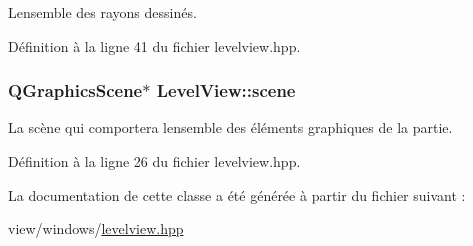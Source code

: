 L\textquotesingle{}ensemble des rayons dessinés. 



Définition à la ligne 41 du fichier levelview.\+hpp.

\hypertarget{classLevelView_a81030b9faa8743a629553447bfb982ea}{}
\subsubsection[{scene}]{\setlength{\rightskip}{0pt plus 5cm}Q\+Graphics\+Scene$\ast$ Level\+View\+::scene\hspace{0.3cm}{\ttfamily [private]}}\label{classLevelView_a81030b9faa8743a629553447bfb982ea}


La scène qui comportera l\textquotesingle{}ensemble des éléments graphiques de la partie. 



Définition à la ligne 26 du fichier levelview.\+hpp.



La documentation de cette classe a été générée à partir du fichier suivant \+:\begin{DoxyCompactItemize}
\item 
view/windows/\hyperlink{levelview_8hpp}{levelview.\+hpp}\end{DoxyCompactItemize}

